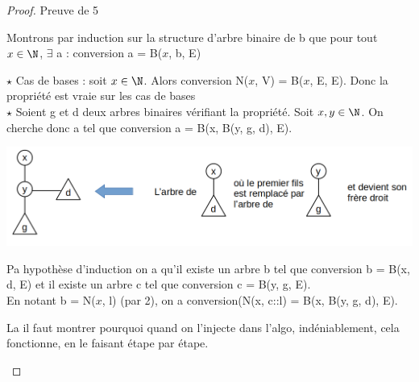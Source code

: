 \begin{proof}Preuve de 5
	
	Montrons par induction sur la structure d'arbre binaire de b que pour tout $x \in \N$, $\exists$ a : conversion a = B($x$, b, E)
	
	$\star$ Cas de bases : soit $x \in \N$. Alors conversion N($x$, V) = B($x$, E, E). Donc la propriété est vraie sur les cas de bases\\
	
	$\star$ Soient g et d deux arbres binaires vérifiant la propriété.
	Soit $x, y\in \N$. On cherche donc a tel que conversion a = B(x, B(y, g, d), E).
	
	\begin{center}
		\includegraphics[scale=0.5]{Developpements/Correspondance arbres binaires et généraux/idee_surjectif.png}
	\end{center}
	
	Pa hypothèse d'induction on a qu'il existe un arbre b tel que conversion b = B(x, d, E) et il existe un arbre c tel que conversion c = B(y, g, E).\\
	
	En notant b = N($x$, l) (par 2), on a conversion(N(x, c::l) = B(x, B(y, g, d), E).
	
	\begin{com}
		La il faut montrer pourquoi quand on l'injecte dans l'algo, indéniablement, cela fonctionne, en le faisant étape par étape.
	\end{com}
	
\end{proof}

